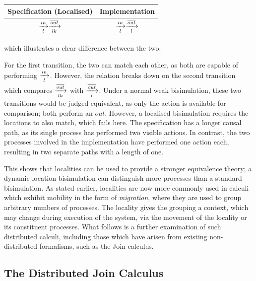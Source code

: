 \begin{center}
\begin{tabular}{c|c}
Specification (Localised) & Implementation \\
\hline
$\xrightarrow[l]{in} \xrightarrow[lk]{\overline{out}}$ &
$\xrightarrow[l]{in} \xrightarrow[l]{\overline{out}}$
\end{tabular}
\end{center}

\noindent which illustrates a clear difference between the two.

For the first transition, the two can match each other, as both are
capable of performing $\xrightarrow[l]{in}$.  However, the relation
breaks down on the second transition which compares $\xrightarrow[lk]{\overline{out}}$
with $\xrightarrow[l]{\overline{out}}$.  Under a normal weak
bisimulation, these two transitions would be judged equivalent, as only
the action is available for comparison; both perform an
$\overline{out}$.  However, a localised bisimulation requires the
locations to also match, which fails here.  The specification has a
longer causal path, as its single process has performed two visible
actions.  In contrast, the two processes involved in the implementation
have performed one action each, resulting in two separate paths with a
length of one.

This shows that localities can be used to provide a stronger equivalence
theory; a dynamic location bisimulation can distinguish more processes
than a standard bisimulation.  As stated earlier, localities are now
more commonly used in calculi which exhibit mobility in the form of
\emph{migration}, where they are used to group arbitrary numbers of
processes.  The locality gives the grouping a context, which may change
during execution of the system, via the movement of the locality or its
constituent processes.  What follows is a further examination of such
distributed calculi, including those which have arisen from existing
non-distributed formalisms, such as the Join calculus.



\subsection{The Distributed Join Calculus}
\label{distjoin}

